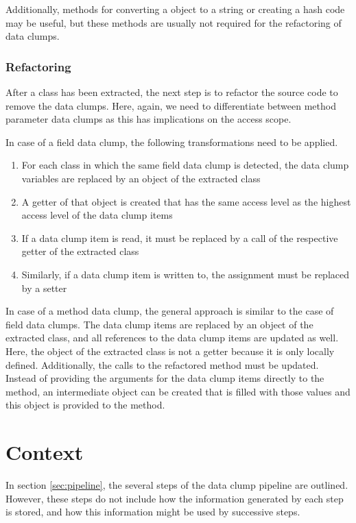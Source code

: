 Additionally, methods for converting a object to a string or creating a hash code may be useful, but these methods are usually not required for the refactoring of data clumps. 


\subsubsection{Refactoring}
After a class has been extracted, the next step is to refactor the source code to remove the data clumps. Here, again, we need to differentiate between method parameter data clumps as this has implications on the access scope. 

In case of a field data clump, the following transformations need to be applied.

\begin{enumerate}
    \item For each class in which the same field data clump is detected, the data clump variables are replaced by an object of the extracted class
    \item A getter of that object is created that has the same access level as the highest access level of the data clump items
    \item If a data clump item is read, it must be replaced by a call of the respective getter of the extracted class
    \item Similarly, if a data clump item is written to, the assignment must be replaced by a setter
\end{enumerate}



In case of a method data clump, the general approach is similar to the case of field data clumps. The data clump items are replaced by an object of the extracted class, and all references to the data clump items are updated as well. Here, the object of the extracted class is not a getter because it is only locally defined. Additionally, the calls to the refactored method must be updated. Instead of providing the arguments for the data clump items directly to the method, an intermediate object can be created that is filled with those values and this object is provided to the method. 


\section{Context}
In section \ref{sec:pipeline}, the several steps of the data clump pipeline are outlined. However, these steps do not include how the information generated by each step is stored, and how this information might be used by successive steps.

